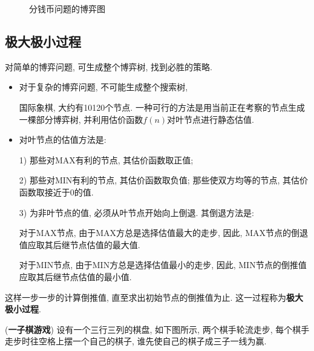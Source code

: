 \begin{answer}
\begin{figure}[H]
\begin{center}
\end{center}
\vspace{-0.5cm}
\caption{分钱币问题的博弈图}
\label{AI32fig001}
\end{figure}
\end{answer}
\subsection{极大极小过程}
    对简单的博弈问题, 可生成整个博弈树, 找到必胜的策略.
\begin{itemize}
\item 对于复杂的博弈问题, 不可能生成整个搜索树,

\begin{example}
  国际象棋, 大约有10120个节点.
    一种可行的方法是用当前正在考察的节点生成一棵部分博弈树, 并利用估价函数$f(n)$对叶节点进行静态估值.
\end{example}
\item 对叶节点的估值方法是:

1) 那些对MAX有利的节点, 其估价函数取正值;

2) 那些对MIN有利的节点, 其估价函数取负值; 那些使双方均等的节点, 其估价函数取接近于0的值.

3) 为非叶节点的值, 必须从叶节点开始向上倒退. 其倒退方法是:

   \qquad{} 对于MAX节点, 由于MAX方总是选择估值最大的走步, 因此, MAX节点的倒退值应取其后继节点估值的最大值.

   \qquad{} 对于MIN节点, 由于MIN方总是选择估值最小的走步, 因此, MIN节点的倒推值应取其后继节点估值的最小值.
\end{itemize}
这样一步一步的计算倒推值, 直至求出初始节点的倒推值为止. 这一过程称为\textbf{极大极小过程}.
\begin{example}
    (\textbf{一子棋游戏}) 设有一个三行三列的棋盘, 如下图所示, 两个棋手轮流走步, 每个棋手走步时往空格上摆一个自己的棋子, 谁先使自己的棋子成三子一线为赢.
\end{example}

